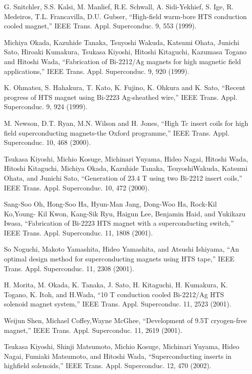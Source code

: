 \noindent [9.348] G. Snitchler, S.S. Kalsi, M. Manlief, R.E. Schwall, A. Sidi-Yekhief, S. Ige, R. Medeiros,
T.L. Francavilla, D.U. Gubser, ``High-field warm-bore HTS conduction
cooled magnet,” IEEE Trans. Appl. Superconduc. 9, 553 (1999).

\noindent [9.349] Michiya Okada, Kazuhide Tanaka, Tsuyoshi Wakuda, Katsumi Ohata, Junichi
Sato, Hiroaki Kumakura, Tsukasa Kiyoshi, Hitoshi Kitaguchi, Kazumasa Togano
and Hitoshi Wada, ``Fabrication of Bi-2212/Ag magnets for high magnetic field
applications,” IEEE Trans. Appl. Superconduc. 9, 920 (1999).

\noindent [9.350] K. Ohmatsu, S. Hahakura, T. Kato, K. Fujino, K. Ohkura and K. Sato, ``Recent
progress of HTS magnet using Bi-2223 Ag-sheathed wire,” IEEE Trans. Appl.
Superconduc. 9, 924 (1999).

\noindent [9.351] M. Newson, D.T. Ryan, M.N. Wilson and H. Jones, ``High Tc insert coils for
high field superconducting magnets-the Oxford programme,” IEEE Trans. Appl.
Superconduc. 10, 468 (2000).

\noindent [9.352] Tsukasa Kiyoshi, Michio Kosuge, Michinari Yuyama, Hideo Nagai, Hitoshi Wada,
Hitoshi Kitaguchi, Michiya Okada, Kazuhide Tanaka, TsuyoshiWakuda, Katsumi
Ohata, and Junichi Sato, ``Generation of 23.4 T using two Bi-2212 insert coils,”
IEEE Trans. Appl. Superconduc. 10, 472 (2000).

\noindent [9.353] Sang-Soo Oh, Hong-Soo Ha, Hyun-Man Jang, Dong-Woo Ha, Rock-Kil Ko,Young-
Kil Kwon, Kang-Sik Ryu, Haigun Lee, Benjamin Haid, and Yukikazu Iwasa, ``Fabrication
of Bi-2223 HTS magnet with a superconducting switch,” IEEE Trans.
Appl. Superconduc. 11, 1808 (2001).

\noindent [9.354] So Noguchi, Makoto Yamashita, Hideo Yamashita, and Atsushi Ishiyama, ``An
optimal design method for superconducting magnets using HTS tape,” IEEE
Trans. Appl. Superconduc. 11, 2308 (2001).

\noindent [9.355] H. Morita, M. Okada, K. Tanaka, J. Sato, H. Kitaguchi, H. Kumakura, K. Togano,
K. Itoh, and H.Wada, ``10 T conduction cooled Bi-2212/Ag HTS solenoid magnet
system,” IEEE Trans. Appl. Superconduc. 11, 2523 (2001).

\noindent [9.356] Weijun Shen, Michael Coffey,Wayne McGhee, ``Development of 9.5T cryogen-free
magnet,” IEEE Trans. Appl. Superconduc. 11, 2619 (2001).

\noindent [9.357] Tsukasa Kiyoshi, Shinji Matsumoto, Michio Kosuge, Michinari Yuyama, Hideo
Nagai, Fumiaki Matsumoto, and Hitoshi Wada, ``Superconducting inserts in highfield
solenoids,” IEEE Trans. Appl. Superconduc. 12, 470 (2002).

